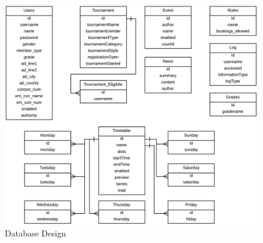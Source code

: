 \begin{figure}[H]
\begin{center}
\includegraphics[width=14cm]{dbdesign.png}
\end{center}
\caption{Database Design}
\label{fig:dbdesign}
\end{figure}

